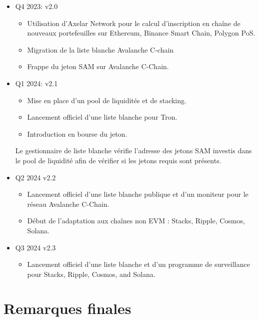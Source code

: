 ﻿\documentclass[a4paper]{article}
\begin{document}
\begin{itemize}
\item
Q4 2023: v2.0
    \begin{itemize}
    \item Utilisation d'Axelar Network pour le calcul d’inscription en chaîne de nouveaux portefeuilles sur Ethereum, Binance Smart Chain, Polygon PoS.
    \item Migration de la liste blanche Avalanche C-chain
    \item Frappe du jeton SAM sur Avalanche C-Chain.
    \end{itemize}

\item
Q1 2024: v2.1
    \begin{itemize}
    \item Mise en place d'un pool de liquidités et de stacking. 
    \item Lancement officiel d'une liste blanche pour Tron.
    \item Introduction en bourse du jeton.
    \end{itemize}

Le gestionnaire de liste blanche vérifie l'adresse des jetons SAM investis dans le pool de liquidité afin de vérifier si les jetons requis sont présents.

\item
Q2 2024 v2.2
    \begin{itemize}
    \item Lancement officiel d'une liste blanche publique et d'un moniteur pour le réseau Avalanche C-Chain.
    \item D\'ebut de l'adaptation aux chaînes non EVM : Stacks, Ripple, Cosmos, Solana.
    \end{itemize}

\item
Q3 2024 v2.3
    \begin{itemize}
    \item Lancement officiel d'une liste blanche et d’un programme de surveillance pour Stacks, Ripple, Cosmos, and Solana.
    \end{itemize}
\end{itemize}

\newpage
\section{Remarques finales}
\end{document}
